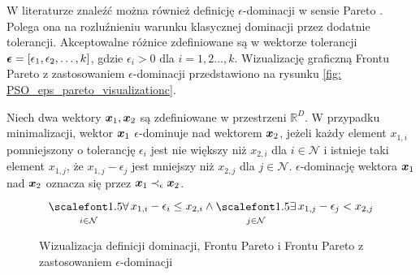 W literaturze znaleźć można również definicję $\epsilon$-dominacji w sensie Pareto \parencite{Zuluaga2016}. Polega ona na rozluźnieniu warunku klasycznej dominacji przez dodatnie tolerancji. Akceptowalne różnice zdefiniowane są w wektorze tolerancji $\bm{\epsilon}=[\epsilon_1,\epsilon_2,\dots,k]$, gdzie $\epsilon_i>0$ dla $i=1,2\dots,k$. Wizualizację graficzną Frontu Pareto z zastosowaniem $\epsilon$-dominacji przedstawiono na rysunku \ref{fig: PSO_eps_pareto_visualizationc}.

\begin{definition}
	Niech dwa wektory $\bm{x}_1, \bm{x}_2$ są zdefiniowane w przestrzeni $\mathbb{R}^D$. W przypadku minimalizacji, wektor $\bm{x}_1$ $\epsilon$-dominuje nad wektorem $\bm{x}_2$, jeżeli każdy element $x_{1,i}$ pomniejszony o tolerancję $\epsilon_i$ jest nie większy niż $x_{2,i}$ dla $i\in \mathcal{N}$ i istnieje taki element $x_{1,j}$, że $x_{1,j}-\epsilon_j$ jest mniejszy niż $x_{2,j}$ dla $j\in\mathcal{N}$. $\epsilon$-dominację wektora $\bm{x}_1$ nad $\bm{x}_2$ oznacza się przez $\bm{x}_1\prec_\epsilon\bm{x}_2$.
	\begin{equation}
		\bigforall_{i\in\mathcal{N}} x_{1,i}-\epsilon_i\le x_{2,i} \land \bigexists_{j\in\mathcal{N}} x_{1,j}-\epsilon_j<x_{2,j}
	\end{equation}
\end{definition}


\begin{figure}[h]
	\centering
	\captionsetup{justification=centering}
	\caption{Wizualizacja definicji dominacji, Frontu Pareto i Frontu Pareto z zastosowaniem $\epsilon$-dominacji}
	\label{fig: PSO_pareto_visualization}
\end{figure}

